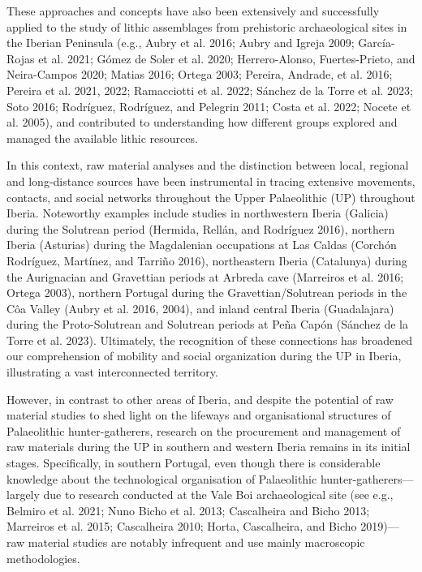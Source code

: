 \documentclass[
  a4paper,
  DIV=11,
  numbers=noendperiod]{scrreprt}
\begin{document}
These approaches and concepts have also been extensively and
successfully applied to the study of lithic assemblages from prehistoric
archaeological sites in the Iberian Peninsula (e.g., Aubry et al. 2016;
Aubry and Igreja 2009; García-Rojas et al. 2021; Gómez de Soler et al.
2020; Herrero-Alonso, Fuertes-Prieto, and Neira-Campos 2020; Matias
2016; Ortega 2003; Pereira, Andrade, et al. 2016; Pereira et al. 2021,
2022; Ramacciotti et al. 2022; Sánchez de la Torre et al. 2023; Soto
2016; Rodríguez, Rodríguez, and Pelegrin 2011; Costa et al. 2022; Nocete
et al. 2005), and contributed to understanding how different groups
explored and managed the available lithic resources.

In this context, raw material analyses and the distinction between
local, regional and long-distance sources have been instrumental in
tracing extensive movements, contacts, and social networks throughout
the Upper Palaeolithic (UP) throughout Iberia. Noteworthy examples
include studies in northwestern Iberia (Galicia) during the Solutrean
period (Hermida, Rellán, and Rodríguez 2016), northern Iberia (Asturias)
during the Magdalenian occupations at Las Caldas (Corchón Rodríguez,
Martínez, and Tarriño 2016), northeastern Iberia (Catalunya) during the
Aurignacian and Gravettian periods at Arbreda cave (Marreiros et al.
2016; Ortega 2003), northern Portugal during the Gravettian/Solutrean
periods in the Côa Valley (Aubry et al. 2016, 2004), and inland central
Iberia (Guadalajara) during the Proto-Solutrean and Solutrean periods at
Peña Capón (Sánchez de la Torre et al. 2023). Ultimately, the
recognition of these connections has broadened our comprehension of
mobility and social organization during the UP in Iberia, illustrating a
vast interconnected territory.

However, in contrast to other areas of Iberia, and despite the potential
of raw material studies to shed light on the lifeways and organisational
structures of Palaeolithic hunter-gatherers, research on the procurement
and management of raw materials during the UP in southern and western
Iberia remains in its initial stages. Specifically, in southern
Portugal, even though there is considerable knowledge about the
technological organisation of Palaeolithic hunter-gatherers---largely
due to research conducted at the Vale Boi archaeological site (see e.g.,
Belmiro et al. 2021; Nuno Bicho et al. 2013; Cascalheira and Bicho 2013;
Marreiros et al. 2015; Cascalheira 2010; Horta, Cascalheira, and Bicho
2019)---raw material studies are notably infrequent and use mainly
macroscopic methodologies.
\end{document}

